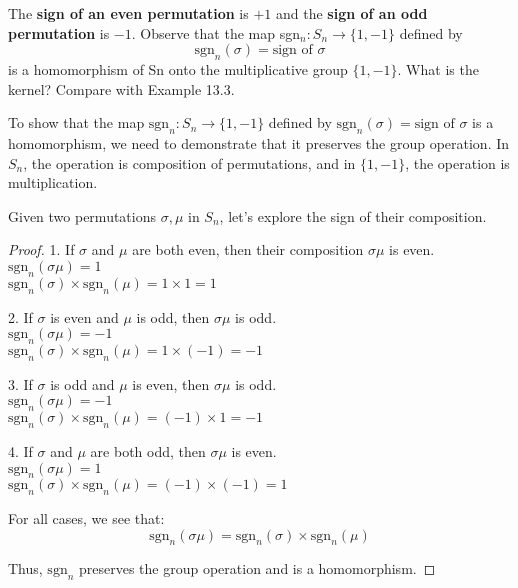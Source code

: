 \documentclass[12pt]{amsart}
\theoremstyle{definition}
\numberwithin{equation}{section}
\theoremstyle{plain}
\begin{document}
\begin{exercise}{48} The \textbf{sign of an even permutation} is $+1$ and the \textbf{sign of an odd permutation} is $-1$. 
    Observe that the map sgn$_n : S_n \rightarrow \{1,-1\}$ defined by \[\text{sgn}_n(\sigma) =\text{sign of }\sigma\] is a homomorphism of Sn onto the multiplicative group $\{1, -1\}$. 
    What is the kernel? Compare with Example 13.3.


    To show that the map \( \text{sgn}_n : S_n \rightarrow \{1,-1\} \) defined by \( \text{sgn}_n(\sigma) = \text{sign of } \sigma \) is a homomorphism, we need to demonstrate that it preserves the group operation. In \( S_n \), the operation is composition of permutations, and in \( \{1,-1\} \), the operation is multiplication.
    
    Given two permutations \( \sigma, \mu \) in \( S_n \), let's explore the sign of their composition.
    
    \begin{proof}
    
1. If \( \sigma \) and \( \mu \) are both even, then their composition \( \sigma\mu \) is even.\\  
   \( \text{sgn}_n(\sigma\mu) = 1 \)\\  
   \( \text{sgn}_n(\sigma) \times \text{sgn}_n(\mu) = 1 \times 1 = 1 \)

2. If \( \sigma \) is even and \( \mu \) is odd, then \( \sigma\mu \) is odd.\\
   \( \text{sgn}_n(\sigma\mu) = -1 \)  \\
   \( \text{sgn}_n(\sigma) \times \text{sgn}_n(\mu) = 1 \times (-1) = -1 \)

3. If \( \sigma \) is odd and \( \mu \) is even, then \( \sigma\mu \) is odd.\\
   \( \text{sgn}_n(\sigma\mu) = -1 \)  \\
   \( \text{sgn}_n(\sigma) \times \text{sgn}_n(\mu) = (-1) \times 1 = -1 \)

4. If \( \sigma \) and \( \mu \) are both odd, then \( \sigma\mu \) is even.\\  
   \( \text{sgn}_n(\sigma\mu) = 1 \)\\
   \( \text{sgn}_n(\sigma) \times \text{sgn}_n(\mu) = (-1) \times (-1) = 1 \)

For all cases, we see that:
\[ \text{sgn}_n(\sigma\mu) = \text{sgn}_n(\sigma) \times \text{sgn}_n(\mu) \]

Thus, \( \text{sgn}_n \) preserves the group operation and is a homomorphism.


\end{proof}
\end{exercise}
\end{document}
